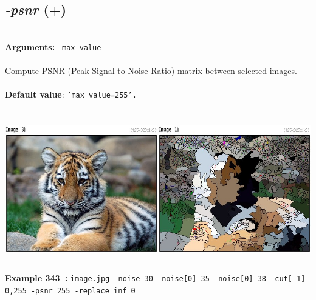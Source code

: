 \documentclass[a4paper,11pt,twoside]{book}
\begin{document}
\subsection{\emph{-psnr} (+)}\vspace*{-0.5em}
~\\\textbf{Arguments: } 
{\small \texttt{\_max\_value}}\\~\\
Compute PSNR (Peak Signal-to-Noise Ratio) matrix between selected images.
~\\~\\\textbf{Default value}: {\small \texttt{'max\_value=255'.}}
\begin{center}\includegraphics[keepaspectratio=true,height=7cm,width=\textwidth]{img/gmic_def343.jpg}\\
{\footnotesize \textbf{Example 343~:} \texttt{image.jpg --noise 30 --noise[0] 35 --noise[0] 38 -cut[-1] 0,255 -psnr 255 -replace\_inf 0}}
\end{center}
\end{document}

